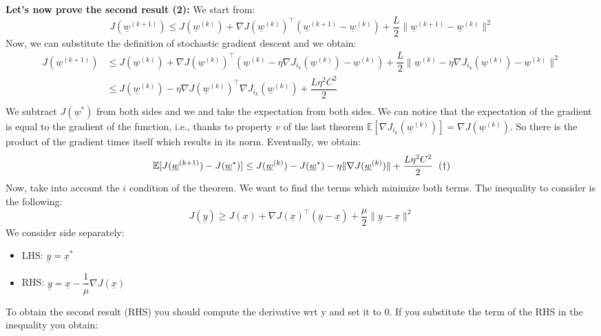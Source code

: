 \noindent\textbf{Let's now prove the second result (2):}
We start from:
\[
    J(\underline{w}^{(k+1)}) \leq J(\underline{w}^{(k)}) + \nabla J(\underline{w}^{(k)})^\intercal (\underline{w}^{(k+1)} - \underline{w}^{(k)}) + \dfrac{L}{2}\|\underline{w}^{(k+1)} - \underline{w}^{(k)}\|^2
\]
Now, we can substitute the definition of stochastic gradient descent and we obtain:
\[
    \begin{split}
        J(\underline{w}^{(k+1)}) &\leq J(\underline{w}^{(k)})+ \nabla J(\underline{w}^{(k)})^\intercal(\underline{w}^{(k)} - \eta \nabla J_{i_k}(\underline{w}^{(k)}) - \underline{w}^{(k)}) + \dfrac{L}{2}\|\underline{w}^{(k)} - \eta \nabla J_{i_k}(\underline{w}^{(k)}) - \underline{w}^{(k)}\|^2\\  
        &\leq J(\underline{w}^{(k)}) - \eta \nabla J(\underline{w}^{(k)})^\intercal \nabla  J_{i_k}(\underline{w}^{(k)})+ \dfrac{L\eta^2 C^2}{2}\\
    \end{split}
\]
We subtract $J(\underline{w}^*)$ from both sides and we and take the expectation from both sides. We can notice that the expectation of the gradient is equal to the gradient of the function, i.e., thanks to property $v$ of the last theorem $\mathbb{E}[\nabla  J_{i_k}(\underline{w}^{(k)})] = \nabla J(\underline{w}^{(k)})$. So there is the product of the gradient times itself which results in its norm. Eventually, we obtain:
\[
    \begin{split}
        \mathbb{E}[J(\underline{w}^{(k+1)}) - J(\underline{w}^*)] &\leq J(\underline{w}^{(k)}) - J(\underline{w}^*) - \eta \|\nabla J(\underline{w}^{(k)})\|+ \dfrac{L\eta^2 C^2}{2} \hspace{0.2cm}(\dagger) \\ 
    \end{split}
\]
Now, take into account the $i$ condition of the theorem. We want to find the terms which minimize both terms. The inequality to consider is the following:
\[
    J(\underline{y}) \geq J(\underline{x}) + \nabla J(\underline{x})^\intercal (\underline{y}-\underline{x}) + \dfrac{\mu}{2}\|\underline{y}-\underline{x}\|^2    
\]
We consider side separately:
\begin{itemize}
    \item LHS: $\underline{y} = \underline{x}^*$
    \item RHS: $\underline{y} = \underline{x} - \dfrac{1}{\mu}\nabla J(\underline{x})$
\end{itemize}
To obtain the second result (RHS) you should compute the derivative wrt y and set it to 0. If you substitute the term of the RHS in the inequality you obtain:
